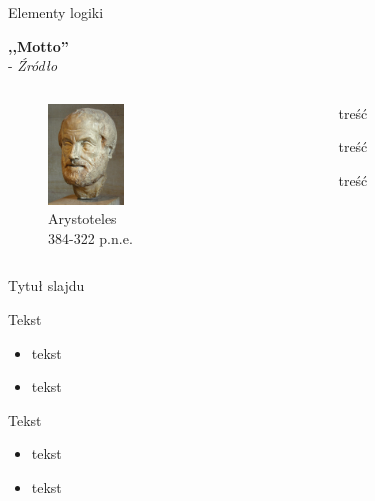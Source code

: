 \documentclass[11pt]{beamer}
\begin{document}
\begin{frame}{Elementy logiki}
\begin{center}
{\small
\textbf{,,Motto''} \\ - {\it Źródło} \\
\vspace{2mm}
}

\begin{minipage}[0.2\textheight]{\textwidth}
\begin{columns}[T]
\begin{column}{0.2\textwidth}
\begin{figure}[!b]
\centering
\captionsetup{justification=centering}
\captionsetup{labelformat=empty}
\includegraphics[width=2cm]{800px-Aristoteles_Louvre}
\caption{{\tiny Arystoteles \\384-322 p.n.e.}}
\end{figure}
\end{column}
\begin{column}{0.8\textwidth}
\begin{itemize}
{\small
\item treść
\item treść
\item treść
}
\end{itemize}
\end{column}
\end{columns}
\end{minipage}

\end{center}
\end{frame}


\begin{frame}{Tytuł slajdu}

\begin{small}
Tekst
\begin{itemize}
\item tekst 
\item tekst
\end{itemize}

\vspace{1mm}

Tekst

\begin{itemize}
\item tekst\\ 
\item tekst\\
\end{itemize}

\end{small}
\end{frame}
\end{document}
